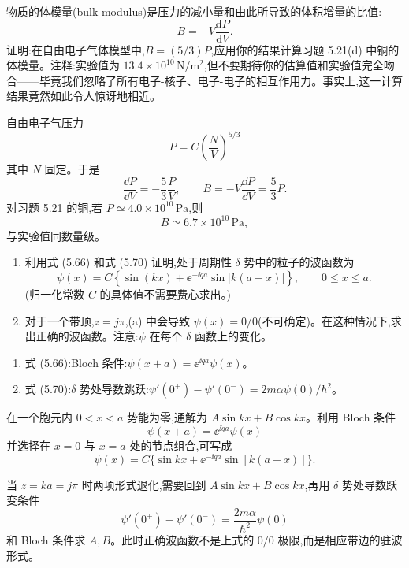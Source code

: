 \begin{question}
物质的体模量(bulk modulus)是压力的减小量和由此所导致的体积增量的比值:
\[
B=-V\frac{\mathrm dP}{\mathrm dV}.
\]
证明:在自由电子气体模型中,$B=(5/3)P$,应用你的结果计算习题 5.21(d) 中铜的体模量。注释:实验值为 $13.4\times10^{10}\,\mathrm{N/m^2}$,但不要期待你的估算值和实验值完全吻合——毕竟我们忽略了所有电子-核子、电子-电子的相互作用力。事实上,这一计算结果竟然如此令人惊讶地相近。
\end{question}
\begin{solution}

自由电子气压力
\[
P=C\left(\frac NV\right)^{5/3}
\]
其中 $N$ 固定。于是
\[
\frac{\dd P}{\dd V}=-\frac53\frac{P}{V},
\qquad
B=-V\frac{\dd P}{\dd V}=\frac53P.
\]
对习题 5.21 的铜,若 $P\simeq4.0\times10^{10}\,\mathrm{Pa}$,则
\[
B\simeq6.7\times10^{10}\,\mathrm{Pa},
\]
与实验值同数量级。

\end{solution}

\begin{question}
\begin{enumerate}
\item 利用式 (5.66) 和式 (5.70) 证明,处于周期性 $\delta$ 势中的粒子的波函数为
\[
\psi(x)=C\left\{\sin(kx)+\ee^{-\ii qa}\sin\bigl[k(a-x)\bigr]\right\},\qquad 0\le x\le a.
\]
(归一化常数 $C$ 的具体值不需要费心求出。)
\item 对于一个带顶,$z=j\pi$,(a) 中会导致 $\psi(x)=0/0$(不可确定)。在这种情况下,求出正确的波函数。注意:$\psi$ 在每个 $\delta$ 函数上的变化。
\end{enumerate}

\par\smallskip
{}
\begin{enumerate}[leftmargin=2.2em,itemsep=0.12em,topsep=0.12em,parsep=0pt]
\item 式 (5.66):Bloch 条件:$\psi(x+a)=\ee^{\ii qa}\psi(x)$。
\item 式 (5.70):$\delta$ 势处导数跳跃:$\psi'(0^+)-\psi'(0^-)=2m\alpha\psi(0)/\hbar^2$。
\end{enumerate}

\end{question}
\begin{solution}

在一个胞元内 $0<x<a$ 势能为零,通解为 $A\sin kx+B\cos kx$。利用 Bloch 条件
\[
\psi(x+a)=\ee^{\ii qa}\psi(x)
\]
并选择在 $x=0$ 与 $x=a$ 处的节点组合,可写成
\[
\psi(x)=C\{\sin kx+\ee^{-\ii qa}\sin[k(a-x)]\}.
\]

当 $z=ka=j\pi$ 时两项形式退化,需要回到 $A\sin kx+B\cos kx$,再用 $\delta$ 势处导数跃变条件
\[
\psi'(0^+)-\psi'(0^-)=\frac{2m\alpha}{\hbar^2}\psi(0)
\]
和 Bloch 条件求 $A,B$。此时正确波函数不是上式的 $0/0$ 极限,而是相应带边的驻波形式。

\end{solution}

